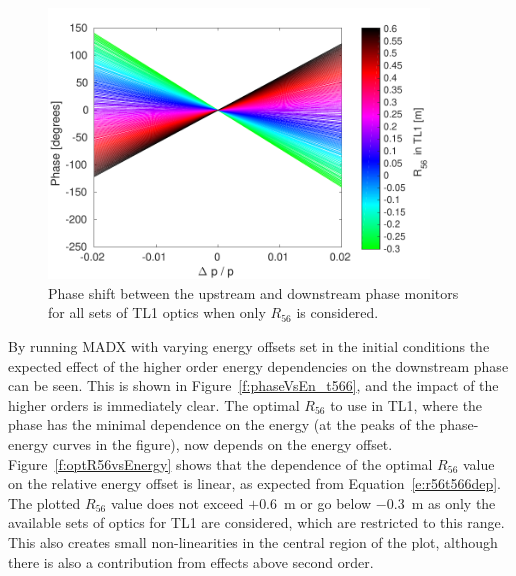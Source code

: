\begin{figure}
  \centering
  \includegraphics[width=0.9\textwidth]{Figures/propagation/phaseVsEn_r56Only}
  \caption{Phase shift between the upstream and downstream phase monitors for all sets of TL1 optics when only \(R_{56}\) is considered.}
  \label{f:phaseVsEn_r56Only}
\end{figure}

By running MADX with varying energy offsets set in the initial conditions the expected effect of the higher order energy dependencies on the downstream phase can be seen. This is shown in Figure~\ref{f:phaseVsEn_t566}, and the impact of the higher orders is immediately clear. The optimal \(R_{56}\) to use in TL1, where the phase has the minimal dependence on the energy (at the peaks of the phase-energy curves in the figure), now depends on the energy offset. Figure~\ref{f:optR56vsEnergy} shows that the dependence of the optimal \(R_{56}\) value on the relative energy offset is linear, as expected from Equation~\ref{e:r56t566dep}. The plotted \(R_{56}\) value does not exceed \(+0.6\)~m or go below \(-0.3\)~m as only the available sets of optics for TL1 are considered, which are restricted to this range. This also creates small non-linearities in the central region of the plot, although there is also a contribution from effects above second order. 

